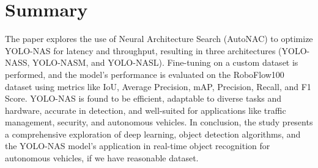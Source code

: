\section{Summary}
The paper explores the use of Neural Architecture Search (AutoNAC) to optimize YOLO-NAS for latency and throughput, resulting in three architectures (YOLO-NASS, YOLO-NASM, and YOLO-NASL). Fine-tuning on a custom dataset is performed, and the model's performance is evaluated on the RoboFlow100 dataset using metrics like IoU, Average Precision, mAP, Precision, Recall, and F1 Score. YOLO-NAS is found to be efficient, adaptable to diverse tasks and hardware, accurate in detection, and well-suited for applications like traffic management, security, and autonomous vehicles.
In conclusion, the study presents a comprehensive exploration of deep learning, object detection algorithms, and the YOLO-NAS model's application in real-time object recognition for autonomous vehicles, if we have reasonable dataset.